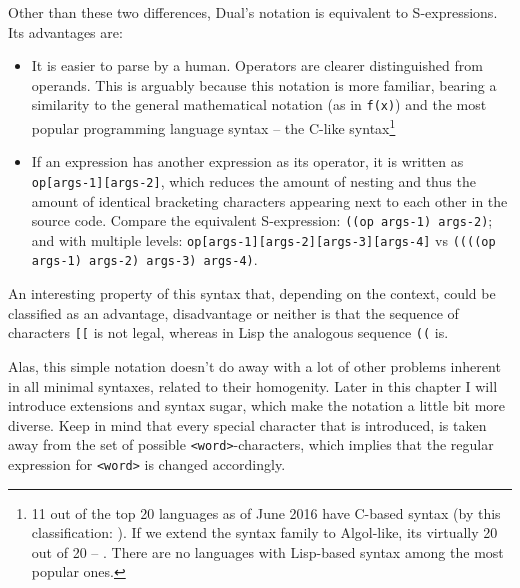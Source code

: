 Other than these two differences, Dual's notation is equivalent to S-expressions. Its advantages are:
\begin{itemize}
    \item It is easier to parse by a human. Operators are clearer distinguished from operands. This is arguably because this notation is more familiar, bearing a similarity to the general mathematical notation (as in \texttt{f(x)}) and the most popular programming language syntax -- the C-like syntax\footnote{11 out of the
        top 20 languages as of June 2016\cite{tiobe} have C-based syntax (by this classification: \cite{c_family_list_wikipedia}). If
        we extend the syntax family to Algol-like, its virtually 20 out of 20 --
        \cite{pl_genealogy}. There are no languages with Lisp-based syntax among the most popular ones.}
    \item If an expression has another expression as its operator, it is written
      as \texttt{op[args-1][args-2]}, which reduces the amount of nesting and
      thus the amount of identical bracketing characters appearing next to each other in the source code. Compare the equivalent S-expression: \texttt{((op args-1) args-2)}; and with multiple levels:
      \texttt{op[args-1][args-2][args-3][args-4]} vs \texttt{((((op args-1)
        args-2) args-3) args-4)}.
\end{itemize}

An interesting property of this syntax that, depending on the context, could be
classified as an advantage, disadvantage or neither is that the sequence of
characters \texttt{[[} is not legal, whereas in Lisp the analogous sequence \texttt{((} is.

Alas, this simple notation doesn't do away with a lot of other problems inherent
in all minimal syntaxes, related to their homogenity. Later in this chapter I will introduce extensions and syntax sugar, which make the notation a little bit more diverse. Keep in mind that every special character that is introduced, is taken away from the set of possible \texttt{<word>}-characters, which implies that the regular expression for \texttt{<word>} is changed accordingly.

